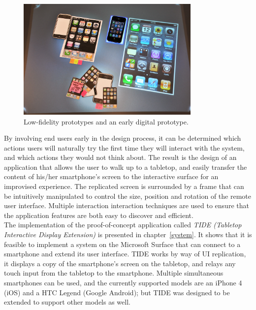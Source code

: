 \begin{figure}[htb]
  \centering
    \includegraphics[width=0.8\textwidth]{images/paperprot2}
  \caption{Low-fidelity prototypes and an early digital prototype.}
  \label{fig:vortex}
\end{figure}

By involving end users early in the design process, it can be determined which actions users will naturally try the first time they will interact with the system, and which actions they would not think about.
The result is the design of an application that allows the user to walk up to a tabletop, and easily transfer the content of his/her smartphone's screen to the interactive surface for an improvised experience.
The replicated screen is surrounded by a frame that can be intuitively manipulated to control the size, position and rotation of the remote user interface.
Multiple interaction interaction techniques are used to ensure that the application features are both easy to discover and efficient.
\\
\linebreak
The implementation of the proof-of-concept application called \emph{TIDE (Tabletop Interactive Display Extension)} is presented in chapter~\ref{system}.
It shows that it is feasible to implement a system on the Microsoft Surface that can connect to a smartphone and extend its user interface.
TIDE works by way of UI replication, it displays a copy of the smartphone's screen on the tabletop, and relays any touch input from the tabletop to the smartphone.
Multiple simultaneous smartphones can be used, and the currently supported models are an iPhone 4 (iOS) and a HTC Legend (Google Android); but TIDE was designed to be extended to support other models as well.


